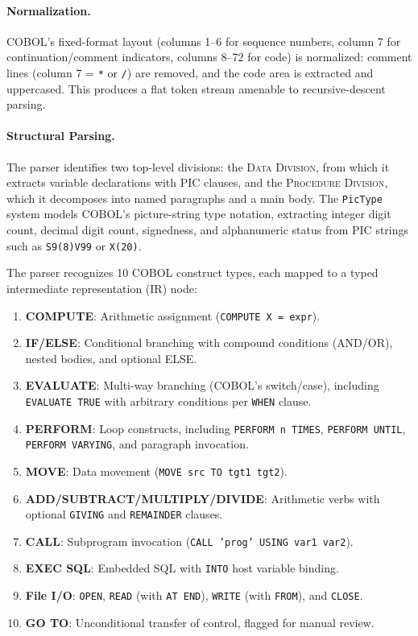 \documentclass[sigconf,nonacm]{acmart}
\begin{document}
\paragraph{Normalization.} COBOL's fixed-format layout (columns 1--6 for sequence numbers, column 7 for continuation/comment indicators, columns 8--72 for code) is normalized: comment lines (column 7 = \texttt{*} or \texttt{/}) are removed, and the code area is extracted and uppercased. This produces a flat token stream amenable to recursive-descent parsing.

\paragraph{Structural Parsing.} The parser identifies two top-level divisions: the \textsc{Data Division}, from which it extracts variable declarations with PIC clauses, and the \textsc{Procedure Division}, which it decomposes into named paragraphs and a main body. The \texttt{PicType} system models COBOL's picture-string type notation, extracting integer digit count, decimal digit count, signedness, and alphanumeric status from PIC strings such as \texttt{S9(8)V99} or \texttt{X(20)}.

The parser recognizes 10 COBOL construct types, each mapped to a typed intermediate representation (IR) node:

\begin{enumerate}
  \item \textbf{COMPUTE}: Arithmetic assignment (\texttt{COMPUTE X = expr}).
  \item \textbf{IF/ELSE}: Conditional branching with compound conditions (AND/OR), nested bodies, and optional ELSE.
  \item \textbf{EVALUATE}: Multi-way branching (COBOL's switch/case), including \texttt{EVALUATE TRUE} with arbitrary conditions per \texttt{WHEN} clause.
  \item \textbf{PERFORM}: Loop constructs, including \texttt{PERFORM~n~TIMES}, \texttt{PERFORM~UNTIL}, \texttt{PERFORM~VARYING}, and paragraph invocation.
  \item \textbf{MOVE}: Data movement (\texttt{MOVE src TO tgt1 tgt2}).
  \item \textbf{ADD/SUBTRACT/MULTIPLY/DIVIDE}: Arithmetic verbs with optional \texttt{GIVING} and \texttt{REMAINDER} clauses.
  \item \textbf{CALL}: Subprogram invocation (\texttt{CALL 'prog' USING var1 var2}).
  \item \textbf{EXEC SQL}: Embedded SQL with \texttt{INTO} host variable binding.
  \item \textbf{File I/O}: \texttt{OPEN}, \texttt{READ} (with \texttt{AT END}), \texttt{WRITE} (with \texttt{FROM}), and \texttt{CLOSE}.
  \item \textbf{GO TO}: Unconditional transfer of control, flagged for manual review.
\end{enumerate}
\end{document}

